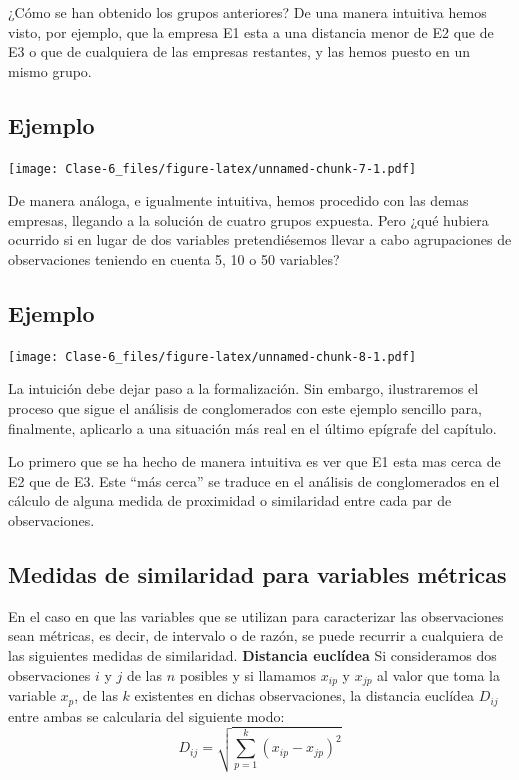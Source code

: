 \documentclass[]{article}
\begin{document}
¿Cómo se han obtenido los grupos anteriores? De una manera intuitiva
hemos visto, por ejemplo, que la empresa E1 esta a una distancia menor
de E2 que de E3 o que de cualquiera de las empresas restantes, y las
hemos puesto en un mismo grupo.

\subsection{Ejemplo}\label{ejemplo-6}

\hypertarget{left}{}
\texttt{[image: Clase-6\_files/figure-latex/unnamed-chunk-7-1.pdf]}

\hypertarget{right}{}
De manera análoga, e igualmente intuitiva, hemos procedido con las demas
empresas, llegando a la solución de cuatro grupos expuesta. Pero ¿qué
hubiera ocurrido si en lugar de dos variables pretendiésemos llevar a
cabo agrupaciones de observaciones teniendo en cuenta 5, 10 o 50
variables?

\subsection{Ejemplo}\label{ejemplo-7}

\hypertarget{left}{}
\texttt{[image: Clase-6\_files/figure-latex/unnamed-chunk-8-1.pdf]}

\hypertarget{right}{}
La intuición debe dejar paso a la formalización. Sin embargo,
ilustraremos el proceso que sigue el análisis de conglomerados con este
ejemplo sencillo para, finalmente, aplicarlo a una situación más real en
el último epígrafe del capítulo.

Lo primero que se ha hecho de manera intuitiva es ver que E1 esta mas
cerca de E2 que de E3. Este ``más cerca'' se traduce en el análisis de
conglomerados en el cálculo de alguna medida de proximidad o similaridad
entre cada par de observaciones.

\subsection{Medidas de similaridad para variables
métricas}\label{medidas-de-similaridad-para-variables-muxe9tricas}

 En el caso en que las variables que se utilizan para caracterizar las
observaciones sean métricas, es decir, de intervalo o de razón, se puede
recurrir a cualquiera de las siguientes medidas de similaridad.
\textbf{Distancia euclídea} Si consideramos dos observaciones \(i\) y
\(j\) de las \(n\) posibles y si llamamos \(x_{ip}\) y \(x_{jp}\) al
valor que toma la variable \(x_p\), de las \(k\) existentes en dichas
observaciones, la distancia euclídea \(D_{ij}\) entre ambas se
calcularia del siguiente modo:
\[D_{ij}=\sqrt{\sum_{p=1}^{k}(x_{ip}-x_{jp})^2}\]
\end{document}
